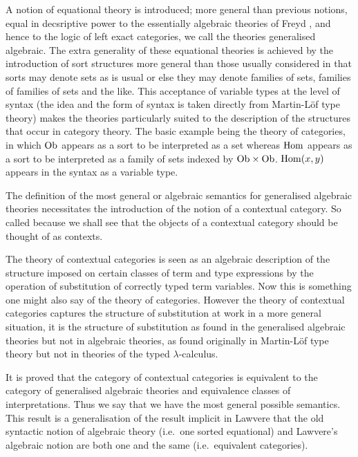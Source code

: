

A notion of equational theory is introduced; more general than previous notions, equal in decsriptive power to the essentially algebraic theories of Freyd \cite{freyd:aspects-of-topoi}, and hence to the logic of left exact categories, we call the theories generalised algebraic.
%
The extra generality of these equational theories is achieved by the introduction of sort structures more general than those usually considered in that sorts may denote sets as is usual or else they may denote families of sets, families of families of sets and the like.
%
This acceptance of variable types at the level of syntax (the idea and the form of syntax is taken directly from Martin-Löf type theory) makes the theories particularly suited to the description of the structures that occur in category theory.
%
The basic example being the theory of categories, in which $\mathrm{Ob}$ appears as a sort to be interpreted as a set whereas $\mathrm{Hom}$ appears as a sort to be interpreted as a family of sets indexed by $\mathrm{Ob} \times \mathrm{Ob}$.
%
$\mathrm{Hom}(x,y)$ appears in the syntax as a variable type.

The definition of the most general or algebraic semantics for generalised algebraic theories necessitates the introduction of the notion of a contextual category.
%
So called because we shall see that the objects of a contextual category should be thought of as contexts.

The theory of contextual categories is seen as an algebraic description of the structure imposed on certain classes of term and type expressions by the operation of substitution of correctly typed term variables.
%
Now this is something one might also say of the theory of categories.
%
%
However the theory of contextual categories captures the structure of substitution at work in a more general situation, it is the structure of substitution as found in the generalised algebraic theories but not in algebraic theories, as found originally in Martin-Löf type theory but not in theories of the typed $\lambda$-calculus.

It is proved that the category of contextual categories is equivalent to the category of generalised algebraic theories and equivalence classes of interpretations.
%
Thus we say that we have the most general possible semantics.
%
This result is a generalisation of the result implicit in Lawvere \cite{lawvere:11} that the old syntactic notion of algebraic theory (i.e.\ one sorted equational) and Lawvere's algebraic notion are both one and the same (i.e.\ equivalent categories).

